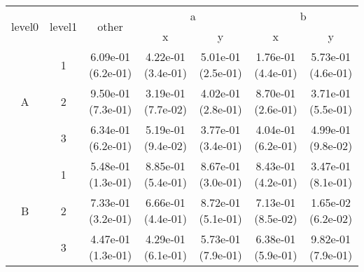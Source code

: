 \begin{tabular}{ccccccc}
\toprule
\multirow{2}{*}{level0} & \multirow{2}{*}{level1}& \multirow{2}{*}{other}&\multicolumn{2}{c}{a}&\multicolumn{2}{c}{b}\tabularnewline
\cmidrule(lr){4-5}
\cmidrule(lr){6-7}
&&&x&y&x&y\tabularnewline
\midrule
\multirow{3}{*}{A}&1& 6.09e-01 (6.2e-01)& 4.22e-01 (3.4e-01)& 5.01e-01 (2.5e-01)& 1.76e-01 (4.4e-01)& 5.73e-01 (4.6e-01)\tabularnewline
&2& 9.50e-01 (7.3e-01)& 3.19e-01 (7.7e-02)& 4.02e-01 (2.8e-01)& 8.70e-01 (2.6e-01)& 3.71e-01 (5.5e-01)\tabularnewline
&3& 6.34e-01 (6.2e-01)& 5.19e-01 (9.4e-02)& 3.77e-01 (3.4e-01)& 4.04e-01 (6.2e-01)& 4.99e-01 (9.8e-02)\tabularnewline
\midrule
\multirow{3}{*}{B}&1& 5.48e-01 (1.3e-01)& 8.85e-01 (5.4e-01)& 8.67e-01 (3.0e-01)& 8.43e-01 (4.2e-01)& 3.47e-01 (8.1e-01)\tabularnewline
&2& 7.33e-01 (3.2e-01)& 6.66e-01 (4.4e-01)& 8.72e-01 (5.1e-01)& 7.13e-01 (8.5e-02)& 1.65e-02 (6.2e-02)\tabularnewline
&3& 4.47e-01 (1.3e-01)& 4.29e-01 (6.1e-01)& 5.73e-01 (7.9e-01)& 6.38e-01 (5.9e-01)& 9.82e-01 (7.9e-01)\tabularnewline
\bottomrule
\end{tabular}
